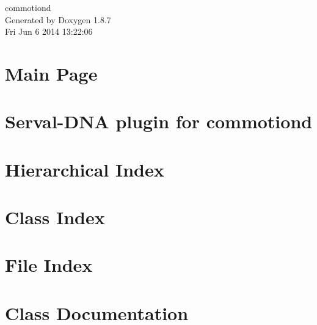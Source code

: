 \documentclass[twoside]{book}
\newcommand{\+}{\discretionary{\mbox{\scriptsize$\hookleftarrow$}}{}{}}
\newcommand{\clearemptydoublepage}{%
  \newpage{\pagestyle{empty}\cleardoublepage}%
}
\begin{document}
\hypersetup{pageanchor=false,
             bookmarks=true,
             bookmarksnumbered=true,
             pdfencoding=unicode
            }
\begin{titlepage}
\vspace*{7cm}
\begin{center}%
{\Large commotiond }\\
\vspace*{1cm}
{\large Generated by Doxygen 1.8.7}\\
\vspace*{0.5cm}
{\small Fri Jun 6 2014 13:22:06}\\
\end{center}
\end{titlepage}
\clearemptydoublepage
\tableofcontents
\clearemptydoublepage
{}
\hypersetup{pageanchor=true}

\chapter{Main Page}
\label{index}\hypertarget{index}{}
\chapter{Serval-\/\+D\+N\+A plugin for commotiond}
\label{md_plugins_serval-dna_README}
\hypertarget{md_plugins_serval-dna_README}{}

\chapter{Hierarchical Index}

\chapter{Class Index}

\chapter{File Index}

\chapter{Class Documentation}





































\end{document}
